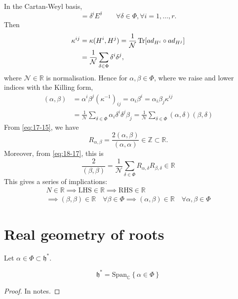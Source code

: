 
In the Cartan-Weyl basis,
\begin{equation}
  [H^{i}, E^{\delta}] = \delta^{i} E^{\delta} \qquad \forall \delta \in \Phi, \forall i = 1, \dots, r.
\end{equation}
Then
\begin{align}
  \kappa^{ij} &= \kappa(H^{i}, H^{j}) = \frac{1}{\mathcal{N}} \Tr[ad_{H^{i}} \circ ad_{H^{j}}] \\
   &= \frac{1}{\mathcal{N}} \sum_{\delta \in \Phi} \delta^{i} \delta^{j},
\end{align}
where $\mathcal{N} \in \mathbb{R}$ is normalisation.
Hence for $\alpha, \beta \in \Phi$, where we raise and lower indices with the Killing form, 
\begin{align}
  (\alpha, \beta) &= \alpha^{i} \beta^{j}(\kappa^{-1})_{ij} = \alpha_{i} \beta^{i} = \alpha_{i} \beta_{j} \kappa^{ij} \\
		  &= \frac{1}{\mathcal{N}} \sum_{\delta \in \Phi} \alpha_{i} \delta^{i} \delta^{j} \beta_{j} = \frac{1}{\mathcal{N}} \sum_{\delta \in \Phi} (\alpha, \delta) (\beta,\delta) \label{eq:18-17}
\end{align}
From \eqref{eq:17-15}, we have
\begin{equation}
  R_{\alpha, \beta} = \frac{2 (\alpha, \beta)}{(\alpha, \alpha)} \in \mathbb{Z} \subset \mathbb{R}.
\end{equation}
Moreover, from \eqref{eq:18-17}, this is
\begin{equation}
  \frac{2}{(\beta, \beta)} = \frac{1}{\mathcal{N}} \sum_{\delta \in \Phi} R_{\alpha, \delta} R_{\beta, \delta} \in \mathbb{R}
\end{equation}
This gives a series of implications:
\begin{multline}
  N \in \mathbb{R} \implies \text{LHS} \in \mathbb{R} \implies \text{RHS} \in \mathbb{R} \\
  \implies (\beta, \beta) \in \mathbb{R} \quad \forall \beta \in \Phi \implies (\alpha, \beta) \in \mathbb{R} \quad \forall \alpha, \beta \in \Phi
\end{multline}

\section{Real geometry of roots}%
\label{sec:real_geometry_of_roots}

Let $\alpha \in \Phi \subset \mathfrak{h}^*$. 
\begin{claim}
  \begin{equation}
    \mathfrak{h}^* = \text{Span}_{\mathbb{C}}\left\{\alpha \in \Phi\right\}
  \end{equation}
\end{claim}
\begin{proof}
  In notes.
\end{proof}


